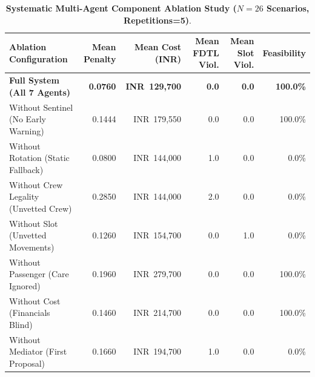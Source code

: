 \begin{table}[htbp]
\centering
\small
\caption{\textbf{Systematic Multi-Agent Component Ablation Study ($N=26$ Scenarios, Repetitions=5)}.}
\label{tab:ablation_results}
\begin{tabular}{@{}lrrrrr@{}}
\toprule
\textbf{Ablation Configuration} & \textbf{Mean Penalty} & \textbf{Mean Cost (INR)} & \textbf{Mean FDTL Viol.} & \textbf{Mean Slot Viol.} & \textbf{Feasibility} \\
\midrule
\textbf{Full System (All 7 Agents)} & \textbf{0.0760} & \textbf{INR~129,700} & \textbf{0.0} & \textbf{0.0} & \textbf{100.0\%} \\
Without Sentinel (No Early Warning) & 0.1444 & INR~179,550 & 0.0 & 0.0 & 100.0\% \\
Without Rotation (Static Fallback) & 0.0800 & INR~144,000 & 1.0 & 0.0 & 0.0\% \\
Without Crew Legality (Unvetted Crew) & 0.2850 & INR~144,000 & 2.0 & 0.0 & 0.0\% \\
Without Slot (Unvetted Movements) & 0.1260 & INR~154,700 & 0.0 & 1.0 & 0.0\% \\
Without Passenger (Care Ignored) & 0.1960 & INR~279,700 & 0.0 & 0.0 & 100.0\% \\
Without Cost (Financials Blind) & 0.1460 & INR~214,700 & 0.0 & 0.0 & 100.0\% \\
Without Mediator (First Proposal) & 0.1660 & INR~194,700 & 1.0 & 0.0 & 0.0\% \\
\bottomrule
\end{tabular}
\end{table}

